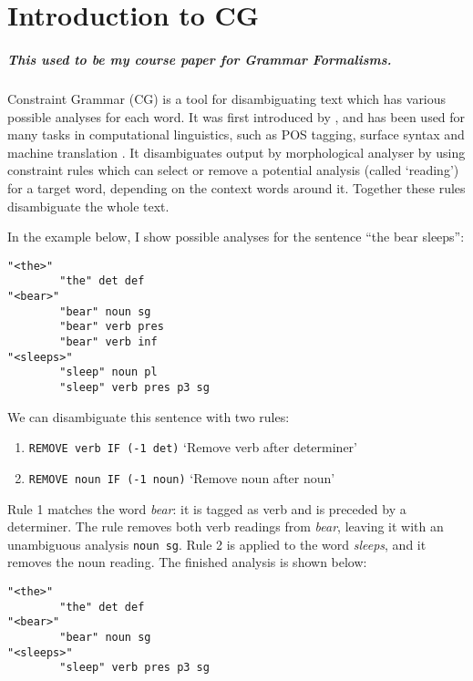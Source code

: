\chapter{Introduction to CG}
 
\paragraph{This used to be my course paper for Grammar Formalisms.}

Constraint Grammar (CG) is a tool for disambiguating text which has various
possible analyses for each word. It was first introduced by
\cite{karlsson1995constraint}, and has been used for many tasks in
computational linguistics, such as POS tagging, surface syntax and
machine translation \cite{bick2011}. It disambiguates output by
morphological analyser by using
constraint rules which can select or remove a potential analysis
(called `reading') for a
target word, depending on the context words around it. Together these rules disambiguate the whole text.

In the example below, I show possible analyses for the sentence ``the bear
sleeps'':


\begin{verbatim}
"<the>"
        "the" det def
"<bear>"
        "bear" noun sg
        "bear" verb pres
        "bear" verb inf
"<sleeps>"
        "sleep" noun pl
        "sleep" verb pres p3 sg
\end{verbatim}

\noindent We can disambiguate this sentence with two rules:

\begin{enumerate}
\def\labelenumi{\arabic{enumi}.}
\itemsep1pt\parskip0pt
\item \texttt{REMOVE verb IF (-1 det)}
  `Remove verb after determiner'
\item  \texttt{REMOVE noun IF (-1 noun)}
  `Remove noun after noun'
\end{enumerate}

\noindent Rule 1 matches the word \emph{bear}: it is tagged as verb and is
preceded by a determiner. The rule removes both verb readings from
\emph{bear}, leaving it with an unambiguous analysis \texttt{noun sg}.
Rule 2 is applied to the word \emph{sleeps}, and it removes the noun
reading. The finished analysis is shown below:


\begin{verbatim}
"<the>"
        "the" det def
"<bear>"
        "bear" noun sg
"<sleeps>"
        "sleep" verb pres p3 sg
\end{verbatim}

